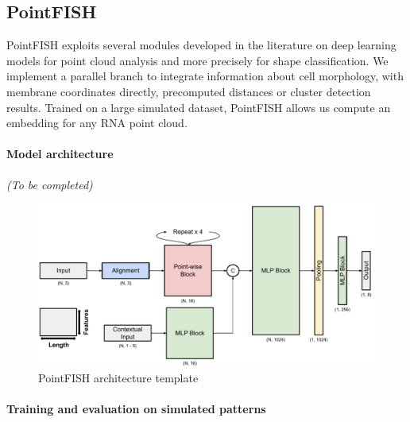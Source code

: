 \subsection{PointFISH} \label{subsec:pointfish}

PointFISH exploits several modules developed in the literature on deep learning models for point cloud analysis and more precisely for shape classification.
We implement a parallel branch to integrate information about cell morphology, with membrane coordinates directly, precomputed distances or cluster detection results.
Trained on a large simulated dataset, PointFISH allows us compute an embedding for any \ac{RNA} point cloud.

\paragraph{Model architecture}

\begin{center}
	\textit{(To be completed)}
\end{center}






\begin{figure}[h]
    \centering
    \includegraphics[width=1\textwidth]{figures/chapter4/PointFISH_architecture}
    \caption{PointFISH architecture template}
    \label{fig:PointFISH_architecture}
\end{figure}

\paragraph{Training and evaluation on simulated patterns}

